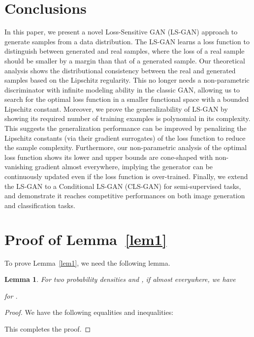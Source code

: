 \documentclass[11pt,fullpage, letterpaper,twoside]{article}
\newtheorem{lemma}{Lemma}
\newcommand{\1}[1]{\mathds{1}_{\left[#1\right]}}
\begin{document}
\section{Conclusions}\label{sec:concl}
In this paper, we present a novel Loss-Sensitive GAN (LS-GAN) approach to generate samples from a data distribution.  The LS-GAN learns a loss function to distinguish between generated and real samples, where the loss of a real sample should be smaller by a margin than that of a generated sample.
Our theoretical analysis shows the distributional consistency between the real and generated samples based on the Lipschitz regularity.
This no longer needs a non-parametric discriminator with infinite modeling ability in the classic GAN, allowing us to search for the optimal loss function in a smaller functional space with a bounded Lipschitz constant.
Moreover, we prove the generalizability of LS-GAN by showing its required number of training examples is polynomial in its complexity. This suggests the generalization performance can be improved by penalizing the Lipschitz constants (via their gradient surrogates) of the loss function to reduce the sample complexity.
Furthermore, our non-parametric analysis of the optimal loss function shows its lower and upper bounds are cone-shaped with non-vanishing gradient almost everywhere, implying the generator can be continuously updated even if the loss function is over-trained.
Finally, we extend the LS-GAN to a Conditional LS-GAN (CLS-GAN) for semi-supervised tasks, and demonstrate it reaches competitive performances on both image generation and classification tasks.





         



\appendix

\section{Proof of Lemma~\ref{lem1}}\label{proof_a}
To prove Lemma~\ref{lem1}, we need the following lemma.

\begin{lemma}\label{lem3}
For two probability densities  and , if  almost everywhere, we have

for .
\end{lemma}
\begin{proof}
We have the following equalities and inequalities:

This completes the proof.
\end{proof}
\end{document}
